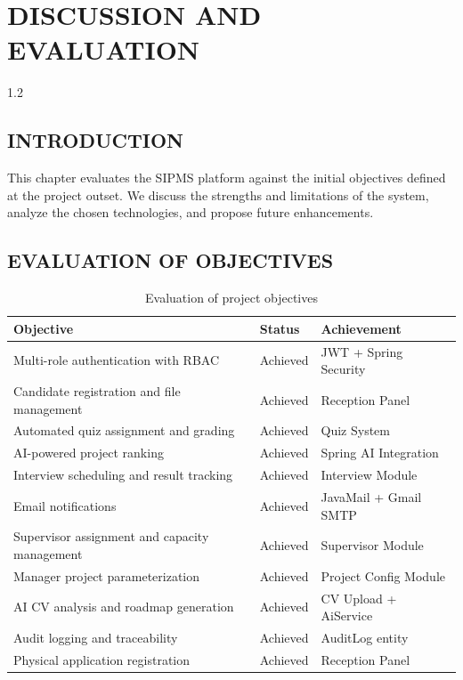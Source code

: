 \chapter{DISCUSSION AND EVALUATION}
\begin{spacing}{1.2}
\minitoc
\thispagestyle{MyStyle}
\end{spacing}
\newpage

\section{INTRODUCTION}
This chapter evaluates the SIPMS platform against the initial objectives defined at the project outset. We discuss the strengths and limitations of the system, analyze the chosen technologies, and propose future enhancements.

\section{EVALUATION OF OBJECTIVES}

\begin{table}[H]
\centering
\begin{tabular}{|p{6cm}|p{4cm}|p{3cm}|}
\hline
\rowcolor{gray!20}
\textbf{Objective} & \textbf{Status} & \textbf{Achievement} \\
\hline
Multi-role authentication with RBAC & Achieved & JWT + Spring Security \\
\hline
Candidate registration and file management & Achieved & Reception Panel \\
\hline
Automated quiz assignment and grading & Achieved & Quiz System \\
\hline
AI-powered project ranking & Achieved & Spring AI Integration \\
\hline
Interview scheduling and result tracking & Achieved & Interview Module \\
\hline
Email notifications & Achieved & JavaMail + Gmail SMTP \\
\hline
Supervisor assignment and capacity management & Achieved & Supervisor Module \\
\hline
Manager project parameterization & Achieved & Project Config Module \\
\hline
AI CV analysis and roadmap generation & Achieved & CV Upload + AiService \\
\hline
Audit logging and traceability & Achieved & AuditLog entity \\
\hline
Physical application registration & Achieved & Reception Panel \\
\hline
\end{tabular}
\caption{Evaluation of project objectives}
\end{table}


